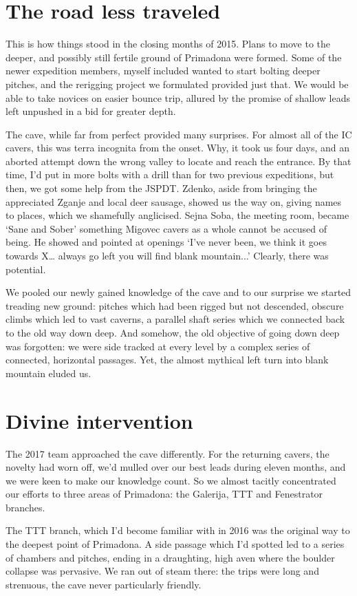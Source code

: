 \section{The road less traveled}
This is how things stood in the closing months of 2015. Plans to move to the deeper, and possibly still fertile ground of Primadona were formed. Some of the newer expedition members, myself included wanted to start bolting deeper pitches, and the rerigging project we formulated provided just that. We would be able to take novices on easier bounce trip, allured by the promise of shallow leads left unpushed in a bid for greater depth.

The cave, while far from perfect provided many surprises. For almost all of the IC cavers, this was terra incognita  from the onset. Why, it took us four days, and an aborted attempt down the wrong valley to locate and reach the entrance. By that time, I’d put in more bolts with a drill than for two previous expeditions, but then, we got some help from the JSPDT. Zdenko, aside from bringing the appreciated Zganje and local deer sausage, showed us the way on, giving names to places, which we shamefully anglicised. Sejna Soba, the meeting room, became ‘Sane and Sober’ something Migovec cavers as a whole cannot be accused of being. He showed and pointed at openings ‘I’ve never been, we think it goes towards X… always go left you will find blank mountain...’ Clearly, there was potential.

We pooled our newly gained knowledge of the cave and to our surprise we started treading new ground: pitches which had been rigged but not descended, obscure climbs which led to vast caverns, a parallel shaft series which we connected back to the old way down deep. And somehow, the old objective of going down deep was forgotten: we were side tracked at every level by a complex series of connected, horizontal passages. Yet, the almost mythical left turn into blank mountain eluded us.

\section{Divine intervention}
The 2017 team approached the cave differently. For the returning cavers, the novelty had worn off, we’d mulled over our best leads during eleven months, and we were keen to make our knowledge count. So we almost tacitly concentrated our efforts to three areas of Primadona: the Galerija, TTT and Fenestrator branches.

The TTT branch, which I’d become familiar with in 2016 was the original way to the deepest point of Primadona. A side passage which I’d spotted led to a series of chambers and pitches, ending in a draughting, high aven where the boulder collapse was pervasive. We ran out of steam there: the trips were long and strenuous, the cave never particularly friendly.


